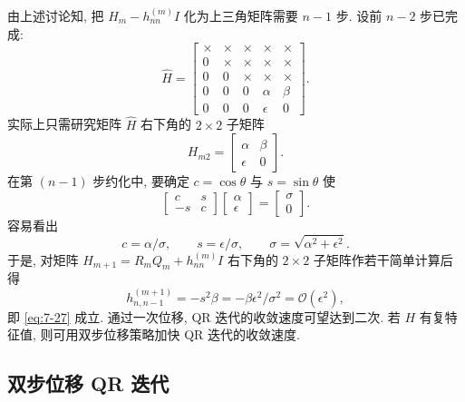 由上述讨论知, 把 $H_m-h_{nn}^{(m)}I$ 化为上三角矩阵需要 $n-1$ 步. 设前 $n-2$ 步已完成:
\[
  \widehat{H}=\begin{bmatrix}
    \times & \times & \times & \times & \times\\
    0 & \times & \times & \times & \times\\
    0 & 0 & \times & \times & \times\\
    0 & 0 & 0 & \alpha & \beta\\
    0 & 0 & 0 & \epsilon & 0
  \end{bmatrix}.
\]
实际上只需研究矩阵 $\widehat{H}$ 右下角的 $2\times2$ 子矩阵
\[
  H_{m2}=\begin{bmatrix}
    \alpha & \beta\\
    \epsilon & 0
  \end{bmatrix}.
\]
在第 $(n-1)$ 步约化中, 要确定 $c=\cos\theta$ 与 $s=\sin\theta$ 使
\[
  \begin{bmatrix}
    c & s\\
    -s & c
  \end{bmatrix}
  \begin{bmatrix}
    \alpha\\ \epsilon
  \end{bmatrix}
  =\begin{bmatrix}
    \sigma\\ 0
  \end{bmatrix}.
\]
容易看出
\[
  c=\alpha/\sigma,\qquad s=\epsilon/\sigma,\qquad
  \sigma=\sqrt{\alpha^2+\epsilon^2}.
\]
于是, 对矩阵 $H_{m+1}=R_mQ_m+h_{nn}^{(m)}I$ 右下角的 $2\times2$ 子矩阵作若干简单计算后得
\[
  h_{n,n-1}^{(m+1)}=-s^2\beta=-\beta\epsilon^2/\sigma^2=\mathcal{O}(\epsilon^2),
\]
即 \eqref{eq:7-27} 成立. 通过一次位移, QR 迭代的收敛速度可望达到二次. 若 $H$ 有复特征值, 则可用双步位移策略加快 QR 迭代的收敛速度.

\subsection{双步位移 QR 迭代}
\label{sec:7-5-3}

